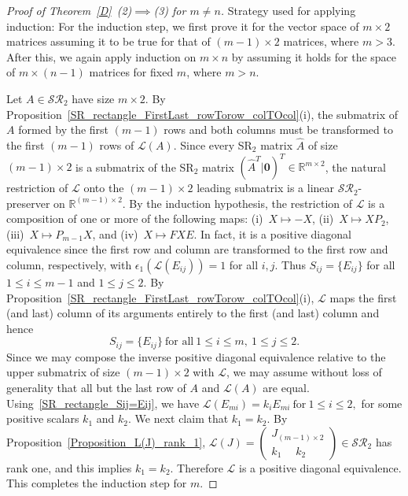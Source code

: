 \documentclass[11pt,reqno]{amsart}
\theoremstyle{plain}
\theoremstyle{definition}
\numberwithin{equation}{section}
\begin{document}
\begin{proof}[Proof of Theorem~\ref{D}~(2)$\implies$(3) for $m\neq n$]
	Strategy used for applying induction: For the induction step, we first prove it for the vector space of $m\times2$ matrices assuming it to be true for that of $(m-1)\times2$ matrices, where $m>3$. After this, we again apply induction on $m\times n$ by assuming it holds for the space of $m\times (n-1)$ matrices for fixed $m$, where $m>n$. 
	
	Let $A\in\mathcal{SR}_2$ have size $m\times2$. By Proposition~\ref{SR_rectangle_FirstLast_rowTorow_colTOcol}(i), the submatrix of $A$ formed by the first $(m-1)$ rows and both columns must be transformed to the first $(m-1)$ rows of $\mathcal{L}(A)$. Since every SR$_2$ matrix $\widehat{A}$ of size $(m-1)\times 2$ is a submatrix of the SR$_2$ matrix $(\widehat{A}^T|\mathbf{0})^T\in\mathbb{R}^{m\times 2}$, the natural restriction of $\mathcal{L}$ onto the $(m-1)\times 2$ leading submatrix is a linear $\mathcal{SR}_2$-preserver on $\mathbb{R}^{(m-1)\times 2}$. By the induction hypothesis, the restriction of $\mathcal{L}$ is a composition of one or more of the following maps: (i)~$X\mapsto -X$, (ii)~$X\mapsto XP_2$, (iii)~$X\mapsto P_{m-1}X$, and (iv)~$X\mapsto FXE$. In fact, it is a positive diagonal equivalence since the first row and column are transformed to the first row and column, respectively, with $\epsilon_1(\mathcal{L}(E_{ij}))=1$ for all $i,j$. Thus $S_{ij}=\{E_{ij}\}$ for all $1\leq i\leq m-1$ and $1\leq j\leq 2$.
	By Proposition~\ref{SR_rectangle_FirstLast_rowTorow_colTOcol}(i), $\mathcal{L}$ maps the first (and last) column of its arguments entirely to the first (and last) column and hence
	\begin{equation}\label{SR_rectangle_Sij=Eij}
		S_{ij}=\{E_{ij}\} ~\text{for all}~ 1\leq i\leq m,~ 1\leq j\leq 2.
	\end{equation} 
	Since we may compose the inverse positive diagonal equivalence relative to the upper submatrix of size $(m-1)\times 2$ with $\mathcal{L}$, we may assume without loss of generality that all but the last row of $A$ and $\mathcal{L}(A)$ are equal. Using~\eqref{SR_rectangle_Sij=Eij}, we have
	$\mathcal{L}(E_{mi})=k_iE_{mi}~\text{for}~ 1\leq i\leq 2,$ for some positive scalars $k_1$ and $k_2$. We next claim that $k_1=k_{2}.$ By Proposition~\ref{Proposition_L(J)_rank_1},
	$\mathcal{L}(J)=\begin{pmatrix} J_{(m-1) \times 2} \\ k_1 \quad \; k_2 \end{pmatrix}\in \mathcal{SR}_2$ has rank one, and  this implies $k_1=k_{2}$. Therefore $\mathcal{L}$ is a positive diagonal equivalence. This completes the induction step for $m$. 
	

\end{proof}
\end{document}
